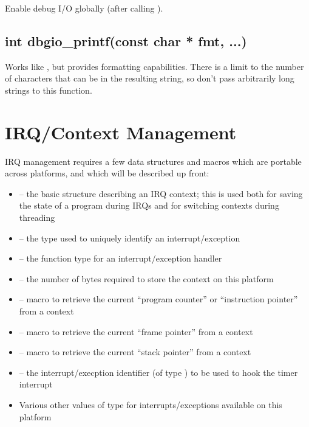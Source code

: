 \documentclass[english]{report}
\begin{document}
Enable debug I/O globally (after calling ).


\subsection{int dbgio\_printf(const char * fmt, ...)}

Works like , but provides formatting
capabilities. There is a limit to the number of characters that
can be in the resulting string, so don't pass arbitrarily long
strings to this function.


\section{IRQ/Context Management}

IRQ management requires a few data structures and macros which are
portable across platforms, and which will be described up front:

\begin{itemize}
\item {} -- the basic structure describing an IRQ context;
  this is used both for saving the state of a program during IRQs and
  for switching contexts during threading
\item {} -- the type used to uniquely identify an interrupt/exception
\item {} -- the function type for an interrupt/exception handler
\item {} -- the number of bytes required to store the context on this platform
\item {} -- macro to retrieve the current ``program counter''
  or ``instruction pointer'' from a context
\item {} -- macro to retrieve the current ``frame pointer'' from a context
\item {} -- macro to retrieve the current ``stack pointer'' from a context
\item {} -- the interrupt/execption identifier (of type )
  to be used to hook the timer interrupt
\item Various other values of type  for interrupts/exceptions available
  on this platform
\end{itemize}
\end{document}
